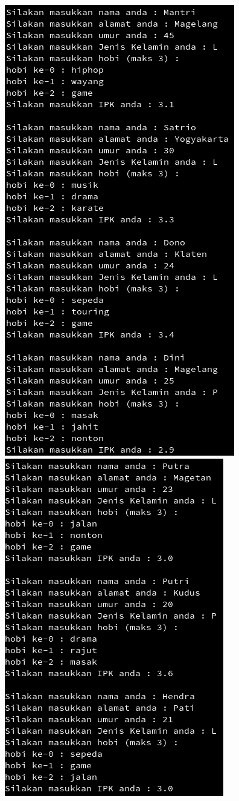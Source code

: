 \documentclass[a4paper,12pt]{article}
\begin{document}
\begin{center}
    \includegraphics[scale=.7]{lat3.png}
    \includegraphics[scale=.7]{lat4.png}

\end{center}
\end{document}
